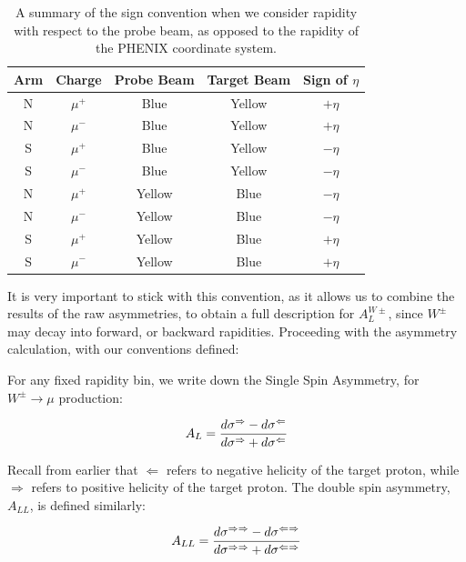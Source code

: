 \begin{table}[ht]
  \centering
  \begin{tabular}{ccccc}
    \toprule
    \textbf{Arm} & 
    \textbf{Charge} &
    \textbf{Probe Beam} & 
    \textbf{Target Beam} & 
    \textbf{Sign of $\eta$} \\
    \midrule
    N & $\mu^+$ & Blue   & Yellow & $+\eta$ \\
    N & $\mu^-$ & Blue   & Yellow & $+\eta$ \\
    S & $\mu^+$ & Blue   & Yellow & $-\eta$ \\
    S & $\mu^-$ & Blue   & Yellow & $-\eta$ \\
    N & $\mu^+$ & Yellow & Blue   & $-\eta$ \\
    N & $\mu^-$ & Yellow & Blue   & $-\eta$ \\
    S & $\mu^+$ & Yellow & Blue   & $+\eta$ \\
    S & $\mu^-$ & Yellow & Blue   & $+\eta$ \\
    \bottomrule
  \end{tabular}
  \caption{
    A summary of the sign convention when we consider rapidity with respect to
    the probe beam, as opposed to the rapidity of the PHENIX coordinate system.
  }
  \label{tab:asymmetry_rapidity_convention}

\end{table}

It is very important to stick with this convention, as it allows us to combine
the results of the raw asymmetries, to obtain a full description for
$A_L^{W\pm}$, since $W^\pm$ may decay into forward, or backward rapidities.
Proceeding with the asymmetry calculation, with our conventions defined:

{\noindent}For any fixed rapidity bin, we write down the Single Spin Asymmetry,
for $W^\pm\rightarrow\mu$ production:

\begin{equation}
  A_L = {
    {d\sigma^{\Rightarrow}-d\sigma^{\Leftarrow}}
    \over
    {d\sigma^{\Rightarrow}+d\sigma^{\Leftarrow}}
  }
\end{equation}

{\noindent}Recall from earlier that $\Leftarrow$ refers to negative helicity of
the target proton, while $\Rightarrow$ refers to positive helicity of the target
proton. The double spin asymmetry, $A_{LL}$, is defined similarly:

\begin{equation}
  A_{LL} = {
    {d\sigma^{\Rightarrow\Rightarrow}-d\sigma^{\Leftarrow\Rightarrow}}
    \over
    {d\sigma^{\Rightarrow\Rightarrow}+d\sigma^{\Leftarrow\Rightarrow}}
  }
\end{equation}

